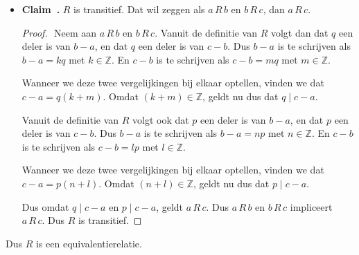 \documentclass[12pt, dutch, a4paper]{article}
\theoremstyle{definition}
\newenvironment{shortclaim}
  {\refstepcounter{claim}\textbf{Claim~\theclaim.}}
{\enskip}
\begin{document}
\begin{enumerate}[(a).]
\begin{itemize}
\begin{proof}
      Dus $q \mid a - b$ en $p \mid a - b$, dus $b\,R\,a$. \newline
      We zien dat $b\,R\,a$ volgt uit $a\,R\,b$, dus $R$ is symmetrisch. \newline
    \end{proof}
    \newpage
    \item 
    \begin{shortclaim}
      $R$ is transitief. Dat wil zeggen als $a\,R\,b$ en $b\,R\,c$,
      dan $a\,R\,c$.
    \end{shortclaim}
    \setcounter{claim}{0}

    \begin{proof} $ $ \newline
      Neem aan $a\,R\,b$ en $b\,R\,c$.
      Vanuit de definitie van $R$ volgt dan dat $q$ een deler is van $b - a$,
      en dat $q$ een deler is van $c - b$. \newline
      Dus $b - a$ is te schrijven als $b - a = kq$ met $k \in \mathbb{Z}$. \newline
      En $c - b$ is te schrijven als $c - b = mq$ met $m \in \mathbb{Z}$.
    
      Wanneer we deze twee vergelijkingen bij elkaar optellen, 
      vinden we dat $c - a = q(k + m)$. \newline 
      Omdat $(k + m) \in \mathbb{Z}$, geldt nu dus dat $q \mid c - a$.

      Vanuit de definitie van $R$ volgt ook dat $p$ een deler is van $b - a$,
      en dat $p$ een deler is van $c - b$. \newline
      Dus $b - a$ is te schrijven als $b - a = np$ met $n \in \mathbb{Z}$. \newline
      En $c - b$ is te schrijven als $c - b = lp$ met $l \in \mathbb{Z}$.

      Wanneer we deze twee vergelijkingen bij elkaar optellen, 
      vinden we dat $c - a = p(n + l)$. \newline  
      Omdat $(n + l) \in \mathbb{Z}$, geldt nu dus dat $p \mid c - a$.

      Dus omdat $q \mid c - a$ en $p \mid c - a$, geldt $a\,R\,c$. \newline
      Dus $a\,R\,b$ en $b\,R\,c$ impliceert $a\,R\,c$. \newline 
      Dus $R$ is transitief. \newline
    \end{proof}
  \end{itemize}
  Dus $R$ is een equivalentierelatie.
  

\end{enumerate}
\end{document}
